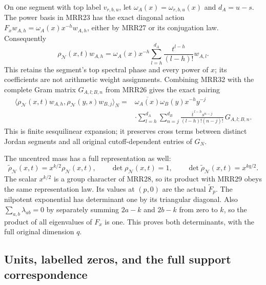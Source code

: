 On one segment with top label $v_{r,b,u}$, let
$\omega_A(x)=\omega_{r,b,u}(x)$ and $d_A=u-s$.
The power basis in MRR23 has the exact diagonal action
$F_xw_{A,h}=\omega_A(x)x^{-h}w_{A,h}$, either by MRR27
or its conjugation law. Consequently
\[
\rho_{\mathcal N}(x,t)w_{A,h}
=\omega_A(x)x^{-h}
\sum_{l=h}^{d_A}\frac{t^{l-h}}{(l-h)!}w_{A,l}.
\tag{MRR32}
\]
This retains the segment's top spectral phase and every
power of $x$; its coefficients are not arithmetic weight
assignments. Combining MRR32 with the complete Gram
matrix $G_{A,l;B,n}$ from MRR26 gives the exact pairing
\[
\begin{split}
\langle\rho_{\mathcal N}(x,t)w_{A,h},
        \rho_{\mathcal N}(y,s)w_{B,j}\rangle_N
={}&\overline{\omega_A(x)}\omega_B(y)x^{-h}y^{-j}\\
&\cdot\sum_{l=h}^{d_A}\sum_{n=j}^{d_B}
\frac{\overline t^{\,l-h}s^{n-j}}
 {(l-h)!(n-j)!}\,G_{A,l;B,n}.
\end{split}
\tag{MRR33}
\]
This is finite sesquilinear expansion; it preserves cross
terms between distinct Jordan segments and all original
cutoff-dependent entries of $G_N$.

The uncentred mass has a full representation as well:
\[
\widetilde\rho_{\mathcal N}(x,t)
=x^{k/2}\rho_{\mathcal N}(x,t),\qquad
\det\rho_{\mathcal N}(x,t)=1,\qquad
\det\widetilde\rho_{\mathcal N}(x,t)=x^{kq/2}.
\tag{MRR34}
\]
The scalar $x^{k/2}$ is a group character of MRR28, so
its product with MRR29 obeys the same representation law.
Its values at $(p,0)$ are the actual $\widetilde F_p$.
The nilpotent exponential has determinant one by its
triangular diagonal. Also
$\sum_{a,b}\lambda_{ab}=0$ by separately summing
$2a-k$ and $2b-k$ from zero to $k$, so the product of
all eigenvalues of $F_x$ is one. This proves both
determinants, with the full original dimension $q$.

\subsection{Units, labelled zeros, and the full support correspondence}

